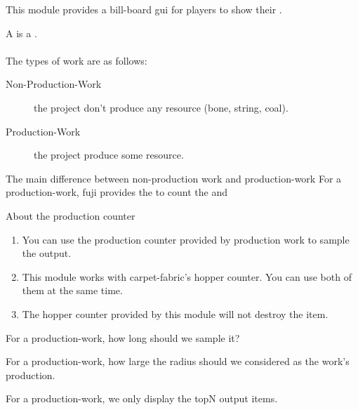 
This module provides a bill-board gui for players to show their .

A  is a . \\
\\
The types of work are as follows:
\begin{description}
    \item [Non-Production-Work] the project don't produce any resource (\eg bone, string, coal).
    \item[Production-Work] the project produce some resource.
\end{description}

\begin{note}{The main difference between non-production work and production-work}
    For a production-work, fuji provides the  to count the  and 
\end{note}

\begin{tips}{About the production counter}
    \begin{enumerate}
        \item You can use the production counter provided by production work to sample the output.
        \item {This module works with carpet-fabric's hopper counter. You can use both of them at the same time.}
        \item The hopper counter provided by this module will not destroy the item.
    \end{enumerate}

\end{tips}


\begin{Configuration}
    \item[sample\_time\_ms]{
        For a production-work, how long should we sample it?
    }
    \item[sample\_distance\_limit]{
        For a production-work, how large the radius should we considered as the work's production.
    }
    \item[sample\_counter\_top\_n]{
        For a production-work, we only display the topN output items.
    }
\end{Configuration}








